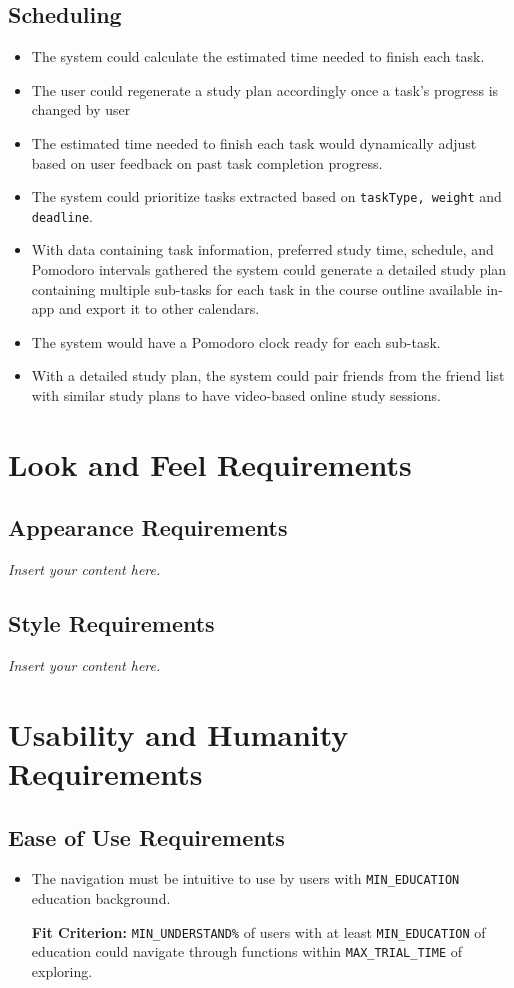 \documentclass[12pt]{article}
\newcommand{\lips}{\textit{Insert your content here.}}
\newcounter{reqnum} %
\newcommand{\rthereqnum}{FR\refstepcounter{reqnum}\thereqnum:}
\newcounter{nfrnum} %
\newcommand{\rthenfrnum}{NFR\refstepcounter{nfrnum}\thenfrnum:}
\begin{document}
\subsection{Scheduling}
\begin{itemize}
\item[\rthereqnum \label{R_GetConsent}]
The system could calculate the estimated time needed to finish each task. 
\item[\rthereqnum \label{R_GetConsent}]
The user could regenerate a study plan accordingly once a task's progress is changed by user
\item[\rthereqnum \label{R_GetConsent}]
The estimated time needed to finish each task would dynamically adjust based on user feedback on past task completion progress.
\item[\rthereqnum \label{R_GetConsent}]
The system could prioritize tasks extracted based on \texttt{taskType, weight} and \texttt{deadline}.
\item[\rthereqnum \label{R_GetConsent}]
With data containing task information, preferred study time, schedule, and Pomodoro intervals gathered the system could generate a detailed study plan containing multiple sub-tasks for each task in the course outline available in-app and export it to other calendars.
\item[\rthereqnum \label{R_GetConsent}]
The system would have a Pomodoro clock ready for each sub-task.
\item[\rthereqnum \label{R_GetConsent}]
With a detailed study plan, the system could pair friends from the friend list with similar study plans to have video-based online study sessions.
\end{itemize}
\section{Look and Feel Requirements}
\subsection{Appearance Requirements}
\lips
\subsection{Style Requirements}
\lips

\section{Usability and Humanity Requirements}
\subsection{Ease of Use Requirements}
\begin{itemize}
\item[\rthenfrnum]The navigation must be intuitive to use by users with \texttt{MIN\_EDUCATION} education background.

\textbf{Fit Criterion:} \texttt{MIN\_UNDERSTAND\%} of users with at least \texttt{MIN\_EDUCATION} of education could navigate through functions within \texttt{MAX\_TRIAL\_TIME} of exploring.
\end{itemize}
\end{document}
